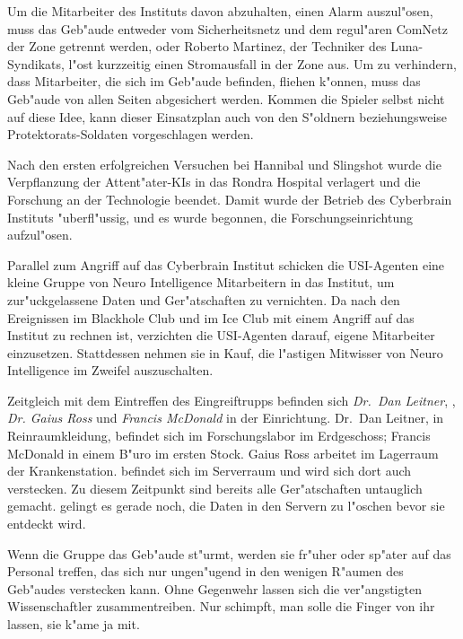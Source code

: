 Um die Mitarbeiter des Instituts davon abzuhalten, einen Alarm auszul"osen, muss das Geb"aude entweder vom Sicherheitsnetz und dem regul"aren ComNetz der Zone getrennt werden, oder Roberto Martinez, der Techniker des Luna-Syndikats, l"ost kurzzeitig einen Stromausfall in der Zone aus. Um zu verhindern, dass Mitarbeiter, die sich im Geb"aude befinden, fliehen k"onnen, muss das Geb"aude von allen Seiten abgesichert werden. Kommen die Spieler selbst nicht auf diese Idee, kann dieser Einsatzplan auch von den S"oldnern beziehungsweise Protektorats-Soldaten vorgeschlagen werden.

Nach den ersten erfolgreichen Versuchen bei Hannibal und Slingshot wurde die Verpflanzung der Attent"ater-KIs in das Rondra Hospital verlagert und die Forschung an der Technologie beendet. Damit wurde der Betrieb des Cyberbrain Instituts "uberfl"ussig, und es wurde begonnen, die Forschungseinrichtung aufzul"osen. 

Parallel zum Angriff auf das Cyberbrain Institut schicken die USI-Agenten eine kleine Gruppe von Neuro Intelligence Mitarbeitern in das Institut, um zur"uckgelassene Daten und Ger"atschaften zu vernichten. Da nach den Ereignissen im Blackhole Club und im Ice Club mit einem Angriff auf das Institut zu rechnen ist, verzichten die USI-Agenten darauf, eigene Mitarbeiter einzusetzen. Stattdessen nehmen sie in Kauf, die l"astigen Mitwisser von Neuro Intelligence im Zweifel auszuschalten.

Zeitgleich mit dem Eintreffen des Eingreiftrupps befinden sich \emph{Dr.~Dan Leitner}, \emph{\ml{}}, \emph{Dr. Gaius Ross} und \emph{Francis McDonald} in der Einrichtung. Dr.~Dan Leitner, in Reinraumkleidung, befindet sich im Forschungslabor im Erdgeschoss; Francis McDonald in einem B"uro im ersten Stock. Gaius Ross arbeitet im Lagerraum der Krankenstation. \ml{} befindet sich im Serverraum und wird sich dort auch verstecken. Zu diesem Zeitpunkt sind bereits alle Ger"atschaften untauglich gemacht. \ml{} gelingt es gerade noch, die Daten in den Servern zu l"oschen bevor sie entdeckt wird.

Wenn die Gruppe das Geb"aude st"urmt, werden sie fr"uher oder sp"ater auf das Personal treffen, das sich nur ungen"ugend in den wenigen R"aumen des Geb"audes verstecken kann. Ohne Gegenwehr lassen sich die ver"angstigten Wissenschaftler zusammentreiben. Nur \ml{} schimpft, man solle die Finger von ihr lassen, sie k"ame ja mit.

